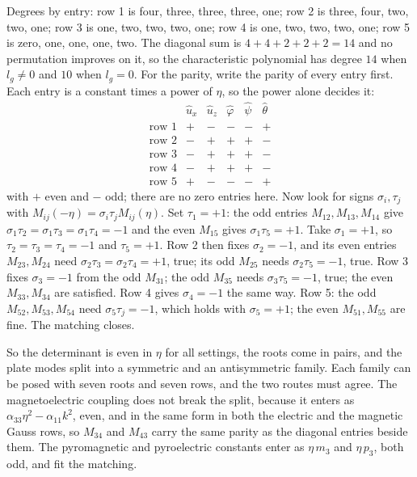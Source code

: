 \documentclass[11pt]{article}
\makeatletter
\newif\ifshowworked
\newenvironment{worked}{%
  \ifshowworked\par\smallskip\noindent\textit{Working.}\par\smallskip\else
  \setbox\z@\vbox\bgroup\fi}{\ifshowworked\par\smallskip\else\egroup\fi}
\makeatother
\begin{document}
\begin{worked}
Degrees by entry: row 1 is four, three, three, three, one; row 2 is three, four, two, two, one; row 3 is
one, two, two, two, one; row 4 is one, two, two, two, one; row 5 is zero, one, one, one, two. The diagonal
sum is $4+4+2+2+2=14$ and no permutation improves on it, so the characteristic polynomial has degree $14$
when $l_g\ne0$ and $10$ when $l_g=0$.
For the parity, write the parity of every entry first. Each entry is a constant times a power of $\eta$, so
the power alone decides it:
\begin{equation}
\begin{array}{c|ccccc}
 & \hat u_x & \hat u_z & \hat\varphi & \hat\psi & \hat\theta\\\hline
\text{row 1} & + & - & - & - & +\\
\text{row 2} & - & + & + & + & -\\
\text{row 3} & - & + & + & + & -\\
\text{row 4} & - & + & + & + & -\\
\text{row 5} & + & - & - & - & +
\end{array}
\end{equation}
with $+$ even and $-$ odd; there are no zero entries here. Now look for signs $\sigma_i,\tau_j$ with
$M_{ij}(-\eta)=\sigma_i\tau_jM_{ij}(\eta)$.
Set $\tau_1=+1$: the odd entries $M_{12},M_{13},M_{14}$ give $\sigma_1\tau_2=\sigma_1\tau_3=\sigma_1\tau_4=-1$
and the even $M_{15}$ gives $\sigma_1\tau_5=+1$. Take $\sigma_1=+1$, so $\tau_2=\tau_3=\tau_4=-1$ and
$\tau_5=+1$. Row 2 then fixes $\sigma_2=-1$, and its even entries $M_{23},M_{24}$ need
$\sigma_2\tau_3=\sigma_2\tau_4=+1$, true; its odd $M_{25}$ needs $\sigma_2\tau_5=-1$, true. Row 3 fixes
$\sigma_3=-1$ from the odd $M_{31}$; the odd $M_{35}$ needs $\sigma_3\tau_5=-1$, true; the even
$M_{33},M_{34}$ are satisfied. Row 4 gives $\sigma_4=-1$ the same way. Row 5: the odd
$M_{52},M_{53},M_{54}$ need $\sigma_5\tau_j=-1$, which holds with $\sigma_5=+1$; the even $M_{51},M_{55}$
are fine. The matching closes.
\end{worked}

So the determinant is even in $\eta$ for all settings, the roots come in pairs, and the plate modes split
into a symmetric and an antisymmetric family. Each family can be posed with seven roots and seven rows, and
the two routes must agree. The magnetoelectric coupling does not break the split, because it enters as
$\alpha_{33}\eta^2-\alpha_{11}k^2$, even, and in the same form in both the electric and the magnetic Gauss
rows, so $M_{34}$ and $M_{43}$ carry the same parity as the diagonal entries beside them. The pyromagnetic
and pyroelectric constants enter as $\eta\,m_3$ and $\eta\,p_3$, both odd, and fit the matching.
\end{document}
